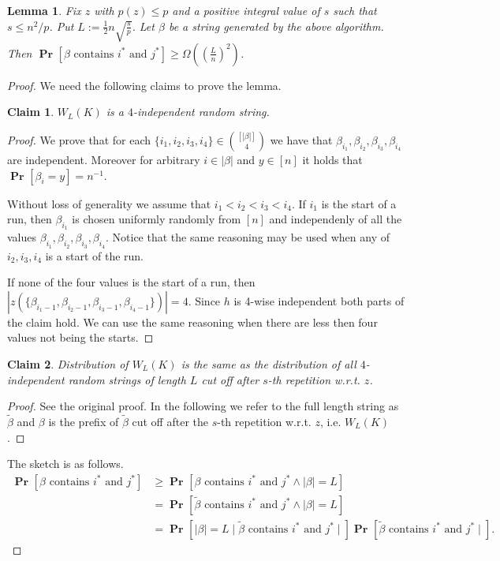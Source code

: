 \documentclass{article}
\newcommand{\probs}[2]{\operatorname{\mathbf{Pr}}_{{#1}}\left[{#2}\right]}
\newcommand{\prob}[1]{\probs{}{#1}}
\newtheorem{lemma}{Lemma}
\newtheorem{claim}{Claim}
\begin{document}
\begin{lemma}
Fix $z$ with $p(z) \leq p$ and a positive integral value of $s$ such that $s \leq n^2/p$.
Put $L := \frac{1}{2}n\sqrt{\frac{s}{p}}$.
Let $\beta$ be a string generated by the above algorithm. 
Then $\prob{\beta\mbox{ contains }i^{*}\mbox{ and }j^{*}} \geq \Omega\left(\left(\frac{L}{n}\right)^2\right)$.
\end{lemma}
\begin{proof}
We need the following claims to prove the lemma.

\begin{claim}
$W_L(K)$ is a $4$-independent random string.
\label{claim-independence}
\end{claim}
\begin{proof}
We prove that for each $\{i_1, i_2, i_3, i_4\} \in \binom{[|\beta|]}{4}$ we have that $\beta_{i_1}, \beta_{i_2}, \beta_{i_3}, \beta_{i_4}$ are independent. Moreover for arbitrary $i \in |\beta|$ and $y \in [n]$ it holds that $\prob{\beta_{i} = y} = n^{-1}$.

Without loss of generality we assume that $i_1 < i_2 < i_3 < i_4$. If $i_1$ is the start of a run, then $\beta_{i_1}$ is chosen uniformly randomly from $[n]$ and independenly of all the values $\beta_{i_1}, \beta_{i_2}, \beta_{i_3}, \beta_{i_4}$.
Notice that the same reasoning may be used when any of $i_2, i_3, i_4$ is a start of the run.

If none of the four values is the start of a run, then $|z(\{\beta_{i_1 - 1}, \beta_{i_2 - 1}, \beta_{i_3 - 1}, \beta_{i_4 - 1}\})| = 4$. 
Since $h$ is 4-wise independent both parts of the claim hold.
We can use the same reasoning when there are less then four values not being the starts.
\end{proof}

\begin{claim}
Distribution of $W_L(K)$ is the same as the distribution of all $4$-independent random strings of length $L$ cut off after $s$-th repetition w.r.t. $z$.
\label{claim-cut-off}
\end{claim}
\begin{proof}
See the original proof. In the following we refer to the full length string as $\tilde \beta$ and $\beta$ is the prefix of $\tilde{\beta}$ cut off after the $s$-th repetition w.r.t. $z$, i.e. $W_L(K)$.
\end{proof}

The sketch is as follows.
\begin{align*}
    \prob{\beta\mbox{ contains }i^{*}\mbox{ and }j^{*}} 
        & \geq \prob{\beta\mbox{ contains }i^{*}\mbox{ and }j^{*} \wedge |\beta| = L} \\
        & = \prob{\tilde{\beta}\mbox{ contains }i^{*}\mbox{ and }j^{*} \wedge |\beta| = L} \\
        & = \prob{|\beta| = L \mid \tilde \beta\mbox{ contains }i^{*}\mbox{ and }j^{*} \mid}\prob{\tilde \beta\mbox{ contains }i^{*}\mbox{ and }j^{*} \mid}.
\end{align*}



\end{proof}
\end{document}
